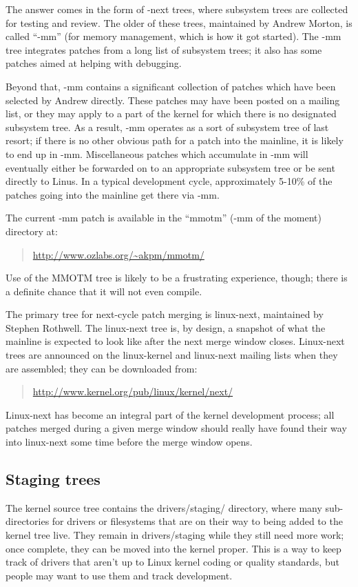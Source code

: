 \documentclass[a4paper,8pt,english]{sphinxmanual}
\begin{document}
The answer comes in the form of -next trees, where subsystem trees are
collected for testing and review.  The older of these trees, maintained by
Andrew Morton, is called ``-mm'' (for memory management, which is how it got
started).  The -mm tree integrates patches from a long list of subsystem
trees; it also has some patches aimed at helping with debugging.

Beyond that, -mm contains a significant collection of patches which have
been selected by Andrew directly.  These patches may have been posted on a
mailing list, or they may apply to a part of the kernel for which there is
no designated subsystem tree.  As a result, -mm operates as a sort of
subsystem tree of last resort; if there is no other obvious path for a
patch into the mainline, it is likely to end up in -mm.  Miscellaneous
patches which accumulate in -mm will eventually either be forwarded on to
an appropriate subsystem tree or be sent directly to Linus.  In a typical
development cycle, approximately 5-10\% of the patches going into the
mainline get there via -mm.

The current -mm patch is available in the ``mmotm'' (-mm of the moment)
directory at:
\begin{quote}

\href{http://www.ozlabs.org/~akpm/mmotm/}{http://www.ozlabs.org/\textasciitilde{}akpm/mmotm/}
\end{quote}

Use of the MMOTM tree is likely to be a frustrating experience, though;
there is a definite chance that it will not even compile.

The primary tree for next-cycle patch merging is linux-next, maintained by
Stephen Rothwell.  The linux-next tree is, by design, a snapshot of what
the mainline is expected to look like after the next merge window closes.
Linux-next trees are announced on the linux-kernel and linux-next mailing
lists when they are assembled; they can be downloaded from:
\begin{quote}

\href{http://www.kernel.org/pub/linux/kernel/next/}{http://www.kernel.org/pub/linux/kernel/next/}
\end{quote}

Linux-next has become an integral part of the kernel development process;
all patches merged during a given merge window should really have found
their way into linux-next some time before the merge window opens.


\subsection{Staging trees}
\label{process/2.Process:staging-trees}
The kernel source tree contains the drivers/staging/ directory, where
many sub-directories for drivers or filesystems that are on their way to
being added to the kernel tree live.  They remain in drivers/staging while
they still need more work; once complete, they can be moved into the
kernel proper.  This is a way to keep track of drivers that aren't
up to Linux kernel coding or quality standards, but people may want to use
them and track development.
\end{document}
